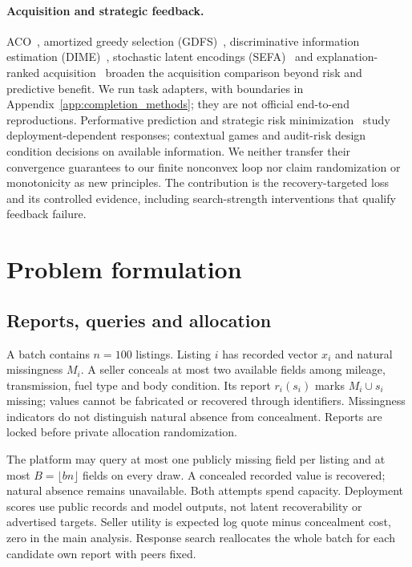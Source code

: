 \documentclass[11pt]{article}
\begin{document}
\paragraph{Acquisition and strategic feedback.}
ACO~\cite{activeoracle}, amortized greedy selection (GDFS)~\cite{gdfs},
discriminative information estimation (DIME)~\cite{dime}, stochastic latent
encodings (SEFA)~\cite{sefa} and explanation-ranked acquisition~\cite{explainafa}
broaden the acquisition comparison beyond risk and predictive benefit.
We run task adapters, with boundaries in Appendix~\ref{app:completion_methods};
they are not official end-to-end reproductions. Performative prediction and
strategic risk minimization~\cite{performative,serm} study deployment-dependent
responses; contextual games and audit-risk design~\cite{contextual,auditrisk}
condition decisions on available information. We neither transfer their
convergence guarantees to our finite nonconvex loop nor claim randomization
or monotonicity as new principles. The contribution is the recovery-targeted
loss and its controlled evidence, including search-strength interventions
that qualify feedback failure.

\section{Problem formulation}\label{sec:problem}
\subsection{Reports, queries and allocation}
A batch contains $n=100$ listings. Listing $i$ has recorded vector $x_i$ and
natural missingness $M_i$. A seller conceals at most two available fields
among mileage, transmission, fuel type and body condition. Its report $r_i(s_i)$
marks $M_i\cup s_i$ missing; values cannot be fabricated or recovered through
identifiers. Missingness indicators do not distinguish natural absence from
concealment. Reports are locked before private allocation randomization.

The platform may query at most one publicly missing field per listing and
at most $B=\lfloor bn\rfloor$ fields on every draw. A concealed recorded
value is recovered; natural absence remains unavailable. Both attempts spend
capacity. Deployment scores use public records and model outputs, not latent
recoverability or advertised targets. Seller utility is expected log quote
minus concealment cost, zero in the main analysis. Response search reallocates
the whole batch for each candidate own report with peers fixed.
\end{document}
